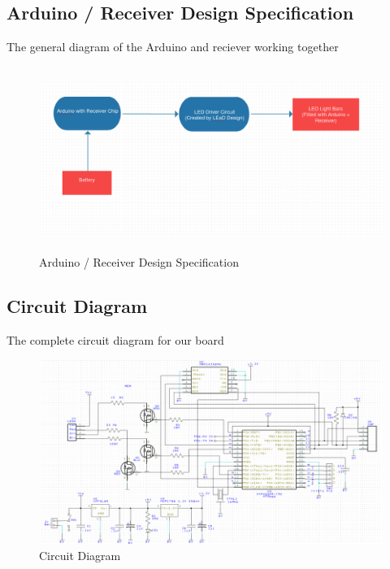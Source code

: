 \documentclass[12pt]{article}
\begin{document}
{{{{		\subsection{Arduino / Receiver Design Specification}
			The general diagram of the Arduino and reciever working together
			\begin{figure}[!htb]
				\centering
				\includegraphics[width = 140mm, height = 60mm]{assets/Arduino_Receiver_Diagram.png}
				\caption{Arduino / Receiver Design Specification \label{overflow}}
			\end{figure}
		\subsection{Circuit Diagram}
			The complete circuit diagram for our board
			\begin{figure}[!htb]
				\centering
				\includegraphics[width = 140mm, height = 60mm]{assets/circuit.png}
				\caption{Circuit Diagram \label{overflow}}
			\end{figure}
		
}}}}
\end{document}
